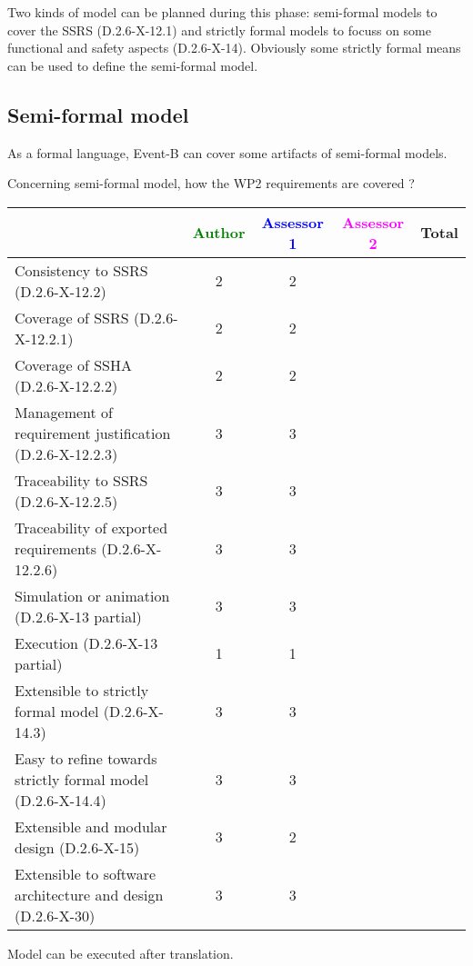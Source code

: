 Two kinds of model can be planned during this phase: semi-formal models to  cover the SSRS (D.2.6-X-12.1) and strictly formal  models to  focuss on some functional and safety aspects (D.2.6-X-14).  Obviously some strictly  formal means can be used to define the semi-formal  model.

\subsection{Semi-formal model}


\begin{author_comment}
As a formal language, Event-B  can cover some artifacts of semi-formal models.
\end{author_comment}

Concerning semi-formal model, how the WP2 requirements are covered ?

\begin{tabular}{|l | c | c | c | c|}
\hline
& \textcolor{green}{Author} & \textcolor{blue}{Assessor 1} & \textcolor{magenta}{Assessor 2} & Total \\
\hline 
Consistency to SSRS (D.2.6-X-12.2) & 2 & 2 & &  \\
\hline
Coverage of SSRS (D.2.6-X-12.2.1)  & 2 & 2 & &  \\
\hline
Coverage of SSHA (D.2.6-X-12.2.2)  & 2 & 2 & &  \\
\hline
Management of requirement justification (D.2.6-X-12.2.3)  & 3 & 3 & &  \\
\hline
Traceability to  SSRS (D.2.6-X-12.2.5)  & 3 & 3 & &  \\
\hline
Traceability of exported requirements (D.2.6-X-12.2.6)  & 3 & 3 & &  \\
\hline
Simulation or animation (D.2.6-X-13 partial)  & 3 & 3 & &  \\
\hline
Execution (D.2.6-X-13 partial)  & 1 & 1 & &  \\
\hline
Extensible to strictly formal model (D.2.6-X-14.3) & 3 & 3 & &  \\
\hline
Easy to  refine towards strictly formal model (D.2.6-X-14.4) & 3 & 3 & &  \\
\hline
Extensible and modular design (D.2.6-X-15)  & 3 & 2 & &  \\
\hline
Extensible to software architecture and design (D.2.6-X-30)   & 3 & 3 & &  \\
\hline
\end{tabular}


\begin{author_comment}
Model can be executed after translation.
\end{author_comment}

